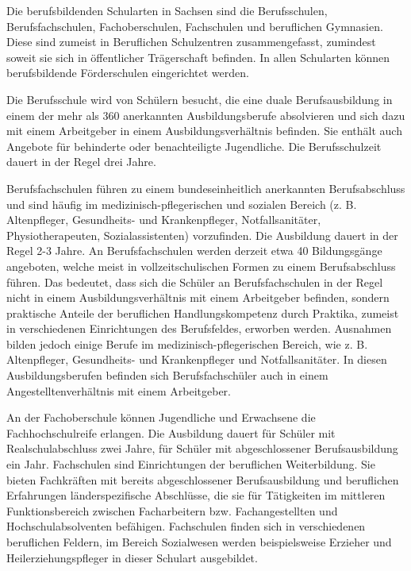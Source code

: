 Die berufsbildenden Schularten in Sachsen sind die Berufsschulen, Berufsfachschulen, Fachoberschulen, Fachschulen und beruflichen Gymnasien. Diese sind zumeist in Beruflichen Schulzentren zusammengefasst, zumindest soweit sie sich in öffentlicher Trägerschaft befinden. In allen Schularten können berufsbildende Förderschulen eingerichtet werden.

Die Berufsschule wird von Schülern besucht, die eine duale Berufsausbildung in einem der mehr als 360 anerkannten Ausbildungsberufe absolvieren und sich dazu mit einem Arbeitgeber in einem Ausbildungsverhältnis befinden. Sie enthält auch Angebote für behinderte oder benachteiligte Jugendliche. Die Berufsschulzeit dauert in der Regel drei Jahre. 

Berufsfachschulen führen zu einem bundeseinheitlich anerkannten Berufsabschluss und sind häufig im medizinisch-pflegerischen und sozialen Bereich (z. B. Altenpfleger, Gesundheits- und Krankenpfleger, Notfallsanitäter, Physiotherapeuten, Sozialassistenten) vorzufinden. Die Ausbildung dauert in der Regel 2-3 Jahre. An Berufsfachschulen werden derzeit etwa 40 Bildungsgänge angeboten, welche meist in vollzeitschulischen Formen zu einem Berufsabschluss führen. Das bedeutet, dass sich die Schüler an Berufsfachschulen in der Regel nicht in einem Ausbildungsverhältnis mit einem Arbeitgeber befinden, sondern praktische Anteile der beruflichen Handlungskompetenz durch Praktika, zumeist in verschiedenen Einrichtungen des Berufsfeldes, erworben werden. Ausnahmen bilden jedoch einige Berufe im medizinisch-pflegerischen Bereich, wie z. B. Altenpfleger, Gesundheits- und Krankenpfleger und Notfallsanitäter. In diesen Ausbildungsberufen befinden sich Berufsfachschüler auch in einem Angestelltenverhältnis mit einem Arbeitgeber.
 
An der Fachoberschule können Jugendliche und Erwachsene die Fachhochschulreife erlangen. Die Ausbildung dauert für Schüler mit Realschulabschluss zwei Jahre, für Schüler mit abgeschlossener Berufsausbildung ein Jahr. 
Fachschulen sind Einrichtungen der beruflichen Weiterbildung. Sie bieten Fachkräften mit bereits abgeschlossener Berufsausbildung und beruflichen Erfahrungen länderspezifische Abschlüsse, die sie für Tätigkeiten im mittleren Funktionsbereich zwischen Facharbeitern bzw. Fachangestellten und Hochschulabsolventen befähigen. Fachschulen finden sich in verschiedenen beruflichen Feldern, im Bereich Sozialwesen werden beispielsweise Erzieher und Heilerziehungspfleger in dieser Schulart ausgebildet. 

